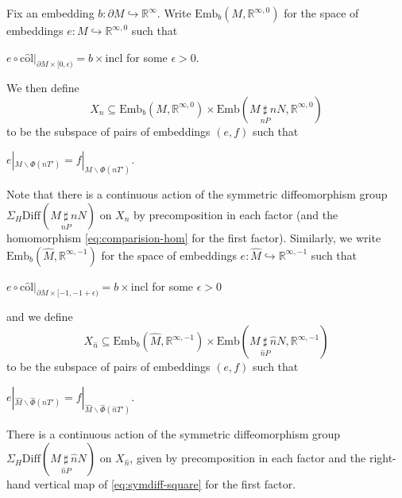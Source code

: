\documentclass[reqno,a4paper]{article}
\numberwithin{equation}{section}
\theoremstyle{italicised}
\theoremstyle{upright}
\theoremstyle{italicised-restate}
\newenvironment{itemizeb}%
{\begin{compactitem}
\renewcommand{\labelitemi}{\ensuremath{\bullet}}
\renewcommand{\labelitemii}{\ensuremath{\bullet}}}%
{\end{compactitem}}
\newcommand{\bR}{\mathbb{R}}
\newcommand{\rinftyz}{\ensuremath{\bR^{\infty,0}}}
\newcommand{\rinftym}{\ensuremath{\bR^{\infty,-1}}}
\newcommand{\colhat}{\ensuremath{\mathrm{c}\hat{\mathrm{o}}\mathrm{l}}}
\begin{document}
Fix an embedding $b \colon \partial M \hookrightarrow \bR^\infty$. Write $\mathrm{Emb}_b(M,\rinftyz)$ for the space of embeddings $e \colon M \hookrightarrow \rinftyz$ such that
\begin{itemizeb}
\item[(i)] $e \circ \mathrm{\colhat}|_{\partial M \times [0,\epsilon)} = b \times \mathrm{incl}$ for some $\epsilon > 0$.
\end{itemizeb}
We then define
\[
X_n \subseteq \mathrm{Emb}_b(M,\rinftyz) \times \mathrm{Emb}(M \underset{nP}{\sharp} nN,\rinftyz)
\]
to be the subspace of pairs of embeddings $(e,f)$ such that
\begin{itemizeb}
\item[(ii)] $e|_{M \smallsetminus \Phi(nT')} = f|_{M \smallsetminus \Phi(nT')}$.
\end{itemizeb}
Note that there is a continuous action of the symmetric diffeomorphism group $\Sigma_H \mathrm{Diff}(M \underset{nP}{\sharp} nN)$ on $X_n$ by precomposition in each factor (and the homomorphism \eqref{eq:comparision-hom} for the first factor). Similarly, we write $\mathrm{Emb}_b(\hat{M},\rinftym)$ for the space of embeddings $e \colon \hat{M} \hookrightarrow \rinftym$ such that
\begin{itemizeb}
\item[(\^{i})] $e \circ \mathrm{\colhat}|_{\partial M \times [-1,-1+\epsilon)} = b \times \mathrm{incl}$ for some $\epsilon > 0$
\end{itemizeb}
and we define
\[
X_{\hat{n}} \subseteq \mathrm{Emb}_b(\hat{M},\rinftym) \times \mathrm{Emb}(M \underset{\hat{n}P}{\sharp} \hat{n}N,\rinftym)
\]
to be the subspace of pairs of embeddings $(e,f)$ such that
\begin{itemizeb}
\item[(\^{i}\^{i})] $e|_{\hat{M} \smallsetminus \hat{\Phi}(\hat{n}T')} = f|_{\hat{M} \smallsetminus \hat{\Phi}(\hat{n}T')}$.
\end{itemizeb}
There is a continuous action of the symmetric diffeomorphism group $\Sigma_H \mathrm{Diff}(M \underset{\hat{n}P}{\sharp} \hat{n}N)$ on $X_{\hat{n}}$, given by precomposition in each factor and the right-hand vertical map of \eqref{eq:symdiff-square} for the first factor.
\end{document}
